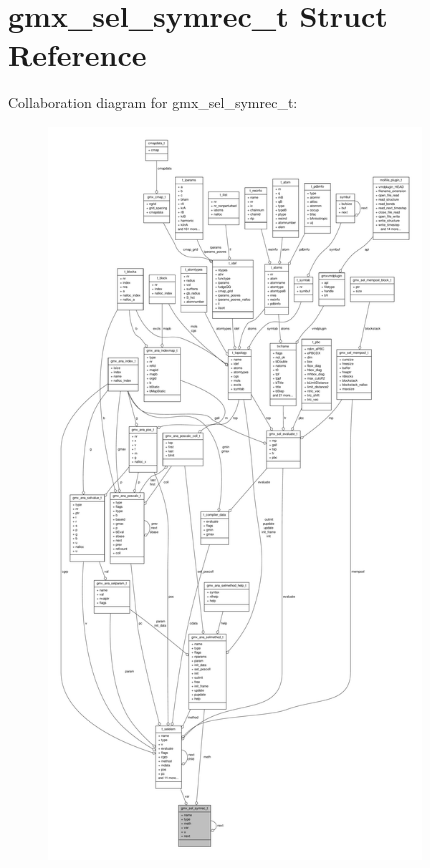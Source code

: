 \hypertarget{structgmx__sel__symrec__t}{\section{gmx\-\_\-sel\-\_\-symrec\-\_\-t \-Struct \-Reference}
\label{structgmx__sel__symrec__t}
}


\-Collaboration diagram for gmx\-\_\-sel\-\_\-symrec\-\_\-t\-:
\nopagebreak
\begin{figure}[H]
\begin{center}
\leavevmode
\includegraphics[height=550pt]{structgmx__sel__symrec__t__coll__graph}
\end{center}
\end{figure}
